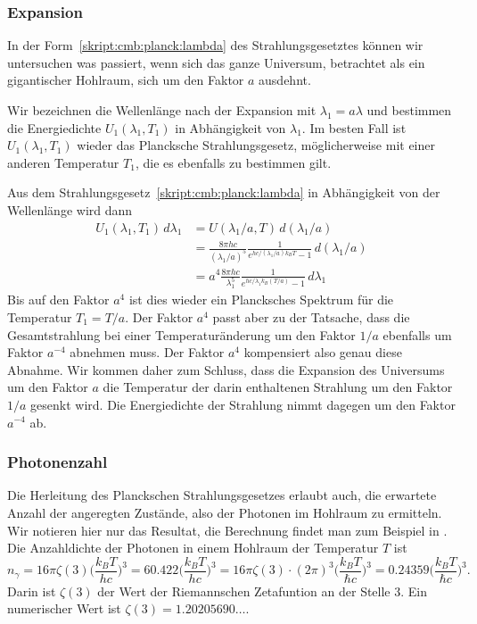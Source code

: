 \subsubsection{Expansion}
In der Form~\eqref{skript:cmb:planck:lambda}
des Strahlungsgesetztes können wir untersuchen was
passiert, wenn sich das ganze Universum, betrachtet als ein gigantischer
Hohlraum, sich um den Faktor $a$ ausdehnt.

Wir bezeichnen die Wellenlänge nach der Expansion mit $\lambda_1=a\lambda$
und bestimmen die Energiedichte $U_1(\lambda_1,T_1)$ in Abhängigkeit von
$\lambda_1$.
Im besten Fall ist $U_1(\lambda_1,T_1)$ wieder das Plancksche
Strahlungsgesetz, möglicherweise mit einer anderen Temperatur $T_1$, die
es ebenfalls zu bestimmen gilt.

Aus dem Strahlungsgesetz~\eqref{skript:cmb:planck:lambda} in Abhängigkeit
von der Wellenlänge wird dann
\begin{align*}
U_1(\lambda_1,T_1)\,d\lambda_1
&=
U(\lambda_1/a,T)\,d(\lambda_1/a)
\\
&=
\frac{8\pi hc}{(\lambda_1/a)^5}
\frac{1}{e^{hc/(\lambda_1/a) k_BT}-1}\,d(\lambda_1/a)
\\
&=
a^4
\frac{8\pi hc}{\lambda_1^5}
\frac{1}{e^{hc/\lambda_1 k_B(T/a)}-1}\,d\lambda_1
\end{align*}
Bis auf den Faktor $a^4$ ist dies wieder ein Plancksches Spektrum
für die Temperatur $T_1=T/a$.
Der Faktor $a^4$ passt aber zu der Tatsache, dass die Gesamtstrahlung
bei einer Temperaturänderung um den Faktor $1/a$ ebenfalls um Faktor
$a^{-4}$ abnehmen muss.
Der Faktor $a^4$ kompensiert also genau diese Abnahme.
Wir kommen daher zum Schluss, dass die Expansion des Universums um den
Faktor $a$ die Temperatur der darin enthaltenen Strahlung um den Faktor
$1/a$ gesenkt wird.
Die Energiedichte der Strahlung nimmt dagegen um den Faktor $a^{-4}$ ab.

\subsubsection{Photonenzahl}
Die Herleitung des Planckschen Strahlungsgesetzes erlaubt auch, die
erwartete Anzahl der angeregten Zustände, also der Photonen im
Hohlraum zu ermitteln.
Wir notieren hier nur das Resultat, die Berechnung findet man zum
Beispiel in \cite[Abschnitt 1.9]{skript:feynman}.
Die Anzahldichte der Photonen in einem Hohlraum der Temperatur $T$ ist
\begin{equation}
n_\gamma
=
16\pi\zeta(3)
\biggl(\frac{k_BT}{hc}\biggr)^3
=
60.422
\biggl(\frac{k_BT}{hc}\biggr)^3
=
16\pi\zeta(3)\cdot (2\pi)^3
\biggl(\frac{k_BT}{\hbar c}\biggr)^3
=
0.24359
\biggl(\frac{k_BT}{\hbar c}\biggr)^3.
\label{skript:cmb:photonenzahl}
\end{equation}
Darin ist $\zeta(3)$ der Wert der Riemannschen Zetafuntion an der
Stelle $3$.
%
%
Ein numerischer Wert ist $\zeta(3)=1.20205690\dots$.

